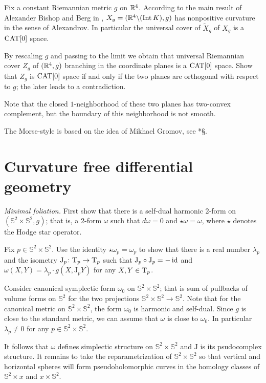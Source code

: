Fix a constant Riemannian metric $g$ on $\mathbb{R}^4$.
According to the main result of Alexander Bishop and Berg in \cite{ABB}, $X_g=(\mathbb{R}^4\backslash (\operatorname{\rm Int}\nolimits K),g)$ has nonpositive curvature in the sense of Alexandrov.
In particular the universal cover of $\tilde X_g$ of $X_g$ is a $\operatorname{\rm CAT}\nolimits[0]$ space.

By rescaling $g$ and passing to the limit we obtain that universal Riemannian cover $Z_g$ of $(\mathbb{R}^4,g)$ branching in the coordinate planes is a $\operatorname{\rm CAT}\nolimits[0]$ space.
Show that $Z_g$ is $\operatorname{\rm CAT}\nolimits[0]$ space if and only if the two planes are orthogonal with respect to $g$;
the later leads to a contradiction.

Note that the closed $1$-neighborhood of these two planes has two-convex complement, but the boundary of this neighborhood is not smooth.

The Morse-style is based on the idea of Mikhael Gromov, see \cite{gromov-SGMC}*{\S\textonehalf}.

\section*{Curvature free differential geometry}

\textit{Minimal foliation.}
First show that there is a self-dual harmonic 2-form on $(\mathbb{S}^2\times\mathbb{S}^2,g)$;
that is, a 2-form $\omega$ such that $d\omega=0$ and $\star\omega=\omega$,
where $\star$ denotes the Hodge star operator.

Fix $p\in \mathbb{S}^2\times\mathbb{S}^2$.
Use the identity $\star\omega_p=\omega_p$
to show that
there is a real number $\lambda_p$ and the isometry $\mathrm{J}_p\colon\mathrm{T}_p\to\mathrm{T}_p$ 
such that
$\mathrm{J}_p\circ\mathrm{J}_p =-\operatorname{\rm id}$ 
and 
$\omega(X,Y)=\lambda_p\cdot g(X,\mathrm{J}_pY)$ for any $X,Y\in \mathrm{T}_p$.

Consider canonical symplectic form $\omega_0$ on $\mathbb{S}^2\times\mathbb{S}^2$;
that is sum of pullbacks of volume forms on $\mathbb{S}^2$  
for the two projections $\mathbb{S}^2\times\mathbb{S}^2\to \mathbb{S}^2$.
Note that for the canonical metric on $\mathbb{S}^2\times\mathbb{S}^2$,
the form $\omega_0$ is harmonic and self-dual. 
Since $g$ is close to the standard metric,
we can assume that $\omega$ is close to $\omega_0$.
In particular $\lambda_p\ne0$ for any $p\in \mathbb{S}^2\times\mathbb{S}^2$.

It follows that $\omega$ defines simplectic structure on $\mathbb{S}^2\times\mathbb{S}^2$
and $\mathrm{J}$ is its psudocomplex structure.
It remains to take the reparametrization of $\mathbb{S}^2\times \mathbb{S}^2$
so that vertical and horizontal spheres will form pseudoholomorphic curves in the homology classes of $\mathbb{S}^2\times x$ and $x\times \mathbb{S}^2$.
 
